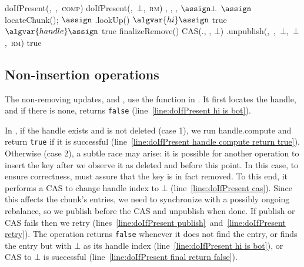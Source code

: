 \begin{algorithm*}[htb]
\begin{algorithmic}[1]
\begin{multicols}{2}
\State \Return doIfPresent(\key,\ ,\ \textsc{comp})
\EndProcedure
\Statex
{}
\State doIfPresent(\key,\ $\bot$,\ \textsc{rm})
\State \Return 
\EndProcedure
\Statex
{}
\State {}, , ,  $\assign \bot$
\State {} $\assign$ locateChunk(\key);  
{} $\assign$ .lookUp(\key)
  $\algvar{hi} \assign$ 
\EndIf
{} \Return true
\EndIf 
\State $\algvar{handle} \assign $
 \Return true 
\label{line:finalizeRemove prev neq handle}
\EndIf
{} 
\State \Return finalizeRemove()
\EndIf
\State CAS(., , $\bot$) \label{line:finalizeRemove cas}
\State {}.unpublish(,\ ,\ $\bot$,\ $\bot$,\ \textsc{rm})
\State \Return true
\EndProcedure
\end{multicols}
\end{algorithmic}
\end{algorithm*}


\subsection{Non-insertion operations} 
\label{ssec:doIfPresent}

The non-removing updates,   and ,  
use the  function   in . 
It first locates the handle, and if there is none,  returns \texttt{false} (line~\ref{line:doIfPresent hi is bot}).

In  , if the handle exists and is not deleted (case 1), we run  handle.compute and return \texttt{true} if it is successful (line~\ref{line:doIfPresent handle compute return true}).
Otherwise (case 2), a subtle race may arise: it is possible for another operation to insert the key after we observe it as deleted and before this point. 
In this case, to ensure correctness,  must assure that the key is in fact removed. 
To this end, it performs a CAS to change handle index to $\bot$ (line~\ref{line:doIfPresent cas}).
Since this affects the chunk's entries, we need to synchronize with a possibly ongoing rebalance,  so we publish before the CAS and unpublish when done. 
If publish or CAS fails then we retry (lines~\ref{line:doIfPresent publish}~and~\ref{line:doIfPresent retry}). 
The operation returns \texttt{false} whenever it does not find the entry, or finds the entry but with $\bot$ as its handle index (line~\ref{line:doIfPresent hi is bot}), or CAS to $\bot$ is successful (line~\ref{line:doIfPresent final return false}).

